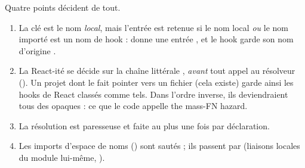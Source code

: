
Quatre points décident de tout.
\begin{enumerate}
  \item La clé est le nom \emph{local}, mais l'entrée est retenue si le nom local \emph{ou} le nom importé est un nom de hook :  donne une entrée , et le hook garde son nom d'origine .
  \item La \og React-ité\fg{} se décide sur la chaîne littérale , \emph{avant} tout appel au résolveur (). Un projet dont le  fait pointer  vers un fichier (cela existe) garde ainsi les hooks de React classés comme tels. Dans l'ordre inverse, ils deviendraient tous des  opaques : ce que le code appelle \og the mass-FN hazard\fg{}.
  \item La résolution est paresseuse et faite au plus une fois par déclaration.
  \item Les imports d'espace de noms () sont sautés ; ils passent par  (liaisons locales du module  lui-même, ).
\end{enumerate}

